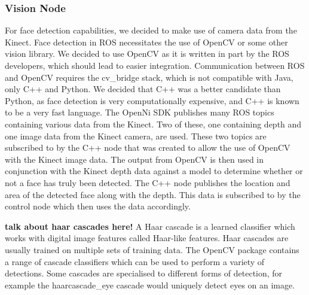 \documentclass[conference]{IEEEtran}
\begin{document}
\subsubsection{Vision Node}
For face detection capabilities, we decided to make use of camera data from the Kinect. Face detection in ROS necessitates the use of OpenCV or some other vision library. We decided to use OpenCV as it is written in part by the ROS developers, which should lead to easier integration. Communication between ROS and OpenCV requires the cv\_bridge stack, which is not compatible with Java, only C++ and Python. We decided that C++ was a better candidate than Python, as face detection is very computationally expensive, and C++ is known to be a very fast language.
The OpenNi SDK publishes many ROS topics containing various data from the Kinect. Two of these, one containing depth and one image data from the Kinect camera, are used. These two topics are subscribed to by the C++ node that was created to allow the use of OpenCV with the Kinect image data. The output from OpenCV is then used in conjunction with the Kinect depth data against a model to determine whether or not a face has truly been detected. The C++ node publishes the location and area of the detected face along with the depth. This data is subscribed to by the control node which then uses the data accordingly.

\textbf{talk about haar cascades here!}
A Haar cascade is a learned classifier which works with digital image features called Haar-like features. Haar cascades are usually trained on multiple sets of training data. The OpenCV package contains a range of cascade classifiers which can be used to perform a variety of detections. Some cascades are specialised to different forms of detection, for example the haarcascade\_eye cascade would uniquely detect eyes on an image.
\end{document}
